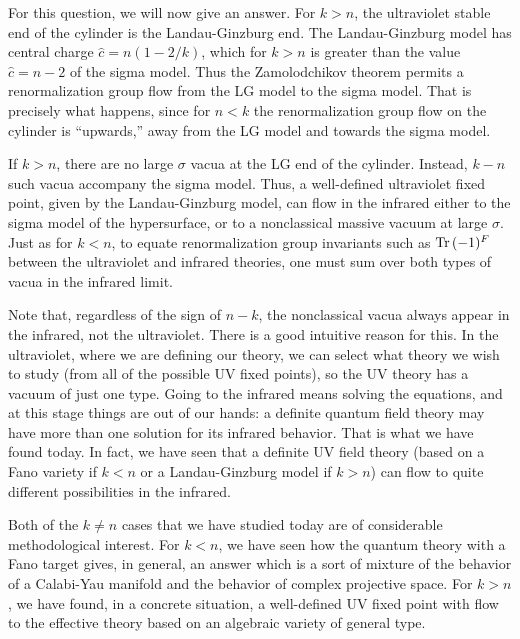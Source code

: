For this question, we will now give an answer.
For $k>n$, the ultraviolet
stable end of the cylinder is the Landau-Ginzburg end.  The Landau-Ginzburg
model has central charge $\widehat c= n(1-2/k)$, which
for $k>n$ is greater than the value $\widehat c = n-2$ of the sigma model.
Thus the Zamolodchikov theorem permits a renormalization group flow
from the LG model to the sigma model.  That is precisely what happens,
since for $n<k$ the renormalization group flow on the cylinder
is ``upwards,'' away from the LG model and towards the sigma model.

If $k>n$, there are no large $\sigma$ vacua at the LG end of the cylinder.
Instead, $k-n$ such vacua accompany the sigma model.  Thus,
a well-defined ultraviolet fixed point, given by the Landau-Ginzburg model,
can flow in the infrared either to the sigma model of the hypersurface,
or to a nonclassical massive vacuum at large $\sigma$.  Just as for $k<n$,
to equate renormalization group invariants such as $\mathop{\rm Tr}\nolimits\,(-1)^F$
between the ultraviolet and infrared theories, one must sum over both
types of vacua in the infrared limit.

\centerline{\quad}
\centerline{\epsfysize=1.35in}
\centerline{\quad}

Note that, regardless of the sign of $n-k$, the nonclassical vacua
always appear in the infrared, not the ultraviolet.  There is a good
intuitive reason for this.  In the ultraviolet,
where we are defining our theory, we can select what theory we wish
to study (from all of the possible UV fixed points), so the UV theory
has a vacuum of just one type.  Going to the infrared means solving
the equations, and at this stage things are out of our hands:
a definite quantum field theory may have more than one solution for
its infrared behavior.  That is what we have found today.  In fact,
we have seen that a definite UV field theory (based on a Fano variety
if $k<n$ or a Landau-Ginzburg model if $k>n$) can flow to quite different
possibilities in the infrared.

Both of the $k\not = n$ cases that we have studied today
are of considerable methodological interest.
For $k<n$, we have seen how the quantum theory with a Fano target
gives, in general, an answer which is a sort of mixture of the behavior
of a Calabi-Yau manifold and the behavior of complex projective space.
For $k>n$, we have found, in a concrete situation, a well-defined UV
fixed point with flow to the effective theory based on an algebraic
variety of general type.


